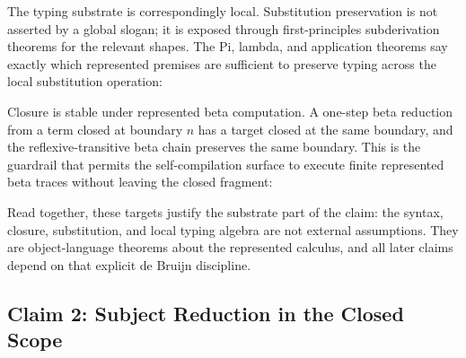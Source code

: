 
The typing substrate is correspondingly local.  Substitution preservation is
not asserted by a global slogan; it is exposed through first-principles
subderivation theorems for the relevant shapes.  The Pi, lambda, and
application theorems say exactly which represented premises are sufficient to
preserve typing across the local substitution operation:


Closure is stable under represented beta computation.  A one-step beta
reduction from a term closed at boundary $n$ has a target closed at the same
boundary, and the reflexive-transitive beta chain preserves the same boundary.
This is the guardrail that permits the self-compilation surface to execute
finite represented beta traces without leaving the closed fragment:


Read together, these targets justify the substrate part of the claim: the
syntax, closure, substitution, and local typing algebra are not external
assumptions.  They are object-language theorems about the represented
calculus, and all later claims depend on that explicit de Bruijn discipline.

\subsection{Claim 2: Subject Reduction in the Closed Scope}
\label{subsec:claim-subject-reduction-closed-scope}

